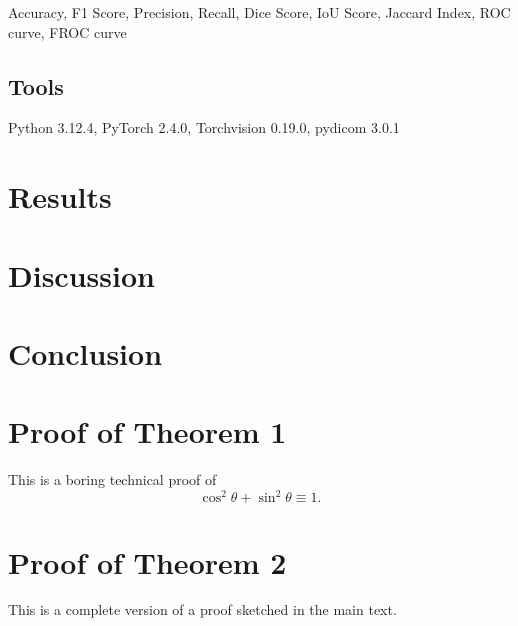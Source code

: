 \documentclass{midl} %
\begin{document}
Accuracy, F1 Score, Precision, Recall, Dice Score, IoU Score, Jaccard Index, ROC curve, FROC curve

\subsection{Tools}

Python 3.12.4, PyTorch 2.4.0, Torchvision 0.19.0, pydicom 3.0.1

\section{Results}

\section{Discussion}

\section{Conclusion}

\clearpage  %




\appendix

\section{Proof of Theorem 1}

This is a boring technical proof of
\begin{equation}\label{eq:example}
\cos^2\theta + \sin^2\theta \equiv 1.
\end{equation}

\section{Proof of Theorem 2}

This is a complete version of a proof sketched in the main text.
\end{document}
